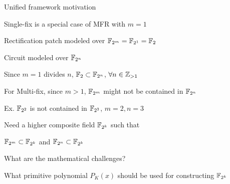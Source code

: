 
\begin{frame}{\large Unified framework motivation}
\bi
	\item Single-fix is a special case of MFR with $m=1$
	\bi
		\item Rectification patch modeled over ${\mathbb{F}}_{2^m} = {\mathbb{F}}_{2^1} = {\mathbb{F}}_2$
		\item Circuit modeled over ${\mathbb{F}}_{2^n}$ 
		\bi
		    \item Since $m=1$ divides $n$, ${\mathbb{F}}_2 \subset {\mathbb{F}}_{2^n}$, $\forall n \in {\mathbb{Z}}_{>1}$
		\ei
	\ei
	\vspace{0.1in}
	\item For Multi-fix, since $m > 1$, ${\mathbb{F}}_{2^m}$ might not be contained in ${\mathbb{F}}_{2^n}$
	\bi
		\item Ex. ${\mathbb{F}}_{2^2}$ is not contained in ${\mathbb{F}}_{2^3}$, $m=2,n=3$
	\ei  
	\vspace{0.1in}
	\item Need a higher composite field ${\mathbb{F}}_{2^k}$ such that 
	\bi
		\item ${\mathbb{F}}_{2^m} \subset {\mathbb{F}}_{2^k}$ and ${\mathbb{F}}_{2^n} \subset {\mathbb{F}}_{2^k}$
	\item What are the mathematical challenges?
	\item What primitive polynomial $P_K(x)$ should be used for constructing ${\mathbb{F}}_{2^k}$
	\ei
\ei
\end{frame}